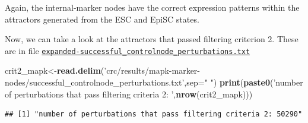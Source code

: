 \documentclass[
]{book}
\newenvironment{Shaded}{\begin{snugshade}}{\end{snugshade}}
\newcommand{\CommentTok}[1]{\textcolor[rgb]{0.56,0.35,0.01}{\textit{#1}}}
\newcommand{\DataTypeTok}[1]{\textcolor[rgb]{0.13,0.29,0.53}{#1}}
\newcommand{\KeywordTok}[1]{\textcolor[rgb]{0.13,0.29,0.53}{\textbf{#1}}}
\newcommand{\NormalTok}[1]{#1}
\newcommand{\StringTok}[1]{\textcolor[rgb]{0.31,0.60,0.02}{#1}}
\begin{document}
Again, the internal-marker nodes have the correct expression patterns within the attractors generated from the ESC and EpiSC states.

Now, we can take a look at the attractors that passed filtering criterion 2. These are in file \href{https://github.com/VeraLiconaResearchGroup/Netisce/blob/main/ipsc_validation/results/expanded-successful_controlnode_perturbations.txt}{\texttt{expanded-successful\_controlnode\_perturbations.txt}}

\begin{Shaded}
\end{Shaded}

\begin{Shaded}
\begin{Highlighting}[]
\NormalTok{crit2_mapk<-}\KeywordTok{read.delim}\NormalTok{(}\StringTok{'crc/results/mapk-marker-nodes/successful_controlnode_perturbations.txt'}\NormalTok{,}\DataTypeTok{sep=}\StringTok{" "}\NormalTok{)}
\KeywordTok{print}\NormalTok{(}\KeywordTok{paste0}\NormalTok{(}\StringTok{'number of perturbations that pass filtering criteria 2: '}\NormalTok{,}\KeywordTok{nrow}\NormalTok{(crit2_mapk)))}
\end{Highlighting}
\end{Shaded}

\begin{verbatim}
## [1] "number of perturbations that pass filtering criteria 2: 50290"
\end{verbatim}

\begin{Shaded}
\end{Shaded}
\end{document}
